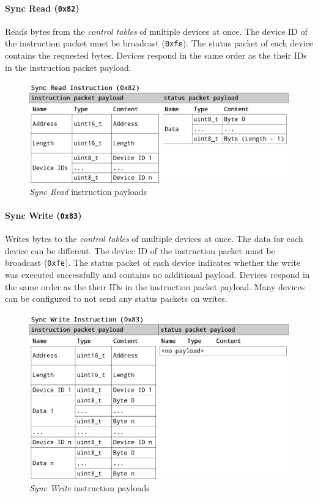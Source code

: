 \paragraph{Sync Read (\lstinline{0x82})}

Reads bytes from the \textit{control tables} of multiple devices at once. The device ID of the
instruction packet must be broadcast (\lstinline{0xfe}). The status packet of each device contains
the requested bytes. Devices respond in the same order as the their IDs in the instruction packet
payload.

\begin{figure}[H]
    \centering
    \includegraphics[scale=0.2]{img/sync_read_packet.png}
    \caption{\textit{Sync Read} instruction payloads}
\end{figure}

\clearpage
\paragraph{Sync Write (\lstinline{0x83})}

Writes bytes to the \textit{control tables} of multiple devices at once. The data for each device
can be different. The device ID of the instruction packet must be broadcast (\lstinline{0xfe}). The
status packet of each device indicates whether the write was executed successfully and contains no
additional payload. Devices respond in the same order as the their IDs in the instruction packet
payload. Many devices can be configured to not send any status packets on writes.

\begin{figure}[H]
    \centering
    \includegraphics[scale=0.2]{img/sync_write_packet.png}
    \caption{\textit{Sync Write} instruction payloads}
\end{figure}

